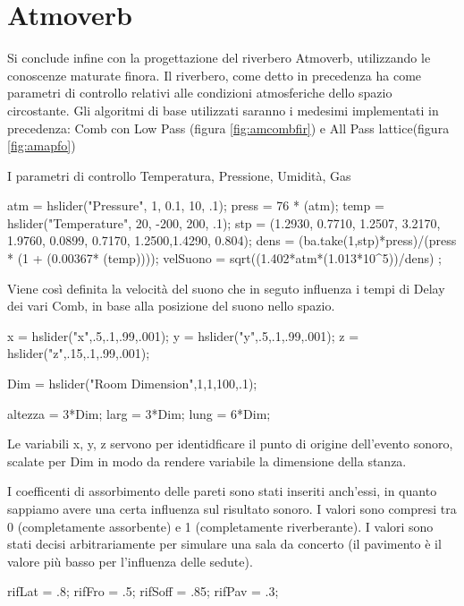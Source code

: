 \section{Atmoverb}

Si conclude infine con la progettazione del riverbero Atmoverb, utilizzando le conoscenze 
maturate finora. 
Il riverbero, come detto in precedenza ha come parametri di controllo relativi alle condizioni
atmosferiche dello spazio circostante. Gli algoritmi di base utilizzati saranno i medesimi 
implementati in precedenza: Comb con Low Pass (figura \ref{fig:amcombfir}) e All Pass lattice(figura \ref{fig:amapfo})

I parametri di controllo Temperatura, Pressione, Umidità, Gas

\begin{code}
atm = hslider("Pressure", 1, 0.1, 10, .1);
press = 76 * (atm);
temp = hslider("Temperature", 20, -200, 200, .1);
stp = (1.2930, 0.7710, 1.2507, 3.2170, 1.9760, 0.0899, 0.7170, 1.2500,1.4290, 0.804);
dens = (ba.take(1,stp)*press)/(press * (1 + (0.00367* (temp))));
velSuono = sqrt((1.402*atm*(1.013*10^5))/dens) ;
\end{code}


\bigskip 

Viene così definita la velocità del suono che in seguto influenza i tempi di Delay dei vari Comb,
in base alla posizione del suono nello spazio.

\begin{code}
x = hslider("x",.5,.1,.99,.001);
y = hslider("y",.5,.1,.99,.001);
z = hslider("z",.15,.1,.99,.001); 

Dim = hslider("Room Dimension",1,1,100,.1);

altezza = 3*Dim;
larg = 3*Dim;
lung = 6*Dim;
\end{code}

Le variabili x, y, z servono per identidficare il punto di origine dell'evento sonoro, scalate 
per Dim in modo da rendere variabile la dimensione della stanza.

I coefficenti di assorbimento delle pareti sono stati inseriti anch'essi, in quanto sappiamo
avere una certa influenza sul risultato sonoro. I valori sono compresi tra 0 
(completamente assorbente) e 1 (completamente riverberante). I valori sono stati decisi
arbitrariamente per simulare una sala da concerto (il pavimento è il valore più basso per 
l'influenza delle sedute). 

\begin{code}
rifLat = .8;
rifFro = .5;
rifSoff = .85;
rifPav = .3;
\end{code}

